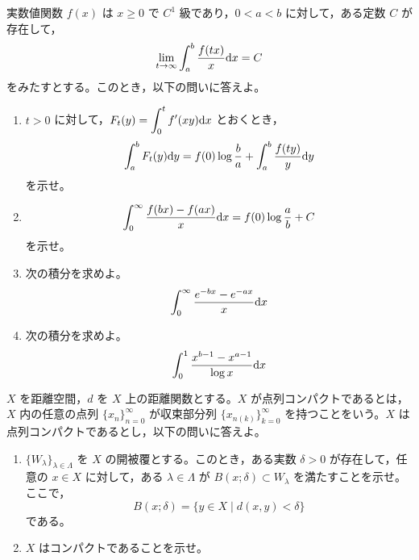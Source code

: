 実数値関数 $f(x)$ は $x\ge0$ で $C^1$ 級であり，$0<a<b$ に対して，ある定数 $C$ が存在して，
\[
\lim_{t\to\infty}\int_a^b\frac{f(tx)}{x}\mathrm{d} x=C
\]
をみたすとする。このとき，以下の問いに答えよ。
\begin{enumerate}
  \item[(問1)] $t>0$ に対して，$\displaystyle F_t(y)=\int_0^t f'(xy)\mathrm{d} x$ とおくとき，
  \[
  \int_a^b F_t(y)\mathrm{d} y=f(0)\log\frac{b}{a}+\int_a^b\frac{f(ty)}{y}\mathrm{d} y
  \]
  を示せ。
  \item[(問2)]
  \[
  \int_0^{\infty}\frac{f(bx)-f(ax)}{x}\mathrm{d} x=f(0)\log\frac{a}{b}+C
  \]
  を示せ。
  \item[(問3)] 次の積分を求めよ。
  \[
  \int_0^{\infty}\frac{e^{-bx}-e^{-ax}}{x}\mathrm{d} x
  \]
  \item[(問4)] 次の積分を求めよ。
  \[
  \int_0^1\frac{x^{b-1}-x^{a-1}}{\log x}\mathrm{d} x
  \]
\end{enumerate}
\wbend

$X$ を距離空間，$d$ を $X$ 上の距離関数とする。$X$ が点列コンパクトであるとは，$X$ 内の任意の点列 $\{x_n\}_{n=0}^{\infty}$ が収束部分列 $\{x_{n(k)}\}_{k=0}^{\infty}$ を持つことをいう。$X$ は点列コンパクトであるとし，以下の問いに答えよ。
\begin{enumerate}
  \item[(問1)] $\{W_\lambda\}_{\lambda\in\Lambda}$ を $X$ の開被覆とする。このとき，ある実数 $\delta>0$ が存在して，任意の $x\in X$ に対して，ある $\lambda\in\Lambda$ が $B(x;\delta)\subset W_\lambda$ を満たすことを示せ。ここで，
  \[
  B(x;\delta)=\{y\in X\mid d(x,y)<\delta\}
  \]
  である。
  \item[(問2)] $X$ はコンパクトであることを示せ。
\end{enumerate}
\wbend
